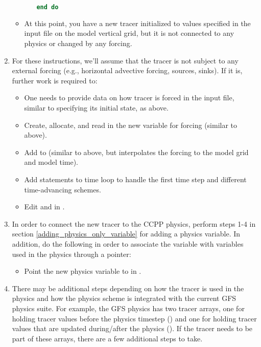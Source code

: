 \begin{enumerate}
\begin{itemize}
\begin{itemize}
\begin{lstlisting}[language = Fortran]
		end do
		\end{lstlisting}
		\end{itemize}
	\item At this point, you have a new tracer initialized to values specified in the input file on the model vertical grid, but it is not connected to any physics or changed by any forcing.
	\end{itemize}
\item For these instructions, we'll assume that the tracer is not subject to any external forcing (e.g., horizontal advective forcing, sources, sinks). If it is, further work is required to:
	\begin{itemize}
	\item One needs to provide data on how tracer is forced in the input file, similar to specifying its initial state, as above.
	\item Create, allocate, and read in the new variable for forcing (similar to above).
	\item Add to  (similar to above, but interpolates the forcing to the model grid and model time).
	\item Add statements to time loop to handle the first time step and different time-advancing schemes.
	\item Edit  and  in .
	\end{itemize}
\item In order to connect the new tracer to the CCPP physics, perform steps 1-4 in section \ref{adding_physics_only_variable} for adding a physics variable. In addition, do the following in order to associate the  variable with variables used in the physics through a pointer:
	\begin{itemize}
	\item Point the new physics variable to  in .
	\end{itemize}
\item There may be additional steps depending on how the tracer is used in the physics and how the physics scheme is integrated with the current GFS physics suite. For example, the GFS physics has two tracer arrays, one for holding tracer values before the physics timestep () and one for holding tracer values that are updated during/after the physics (). If the tracer needs to be part of these arrays, there are a few additional steps to take.
\end{enumerate}






